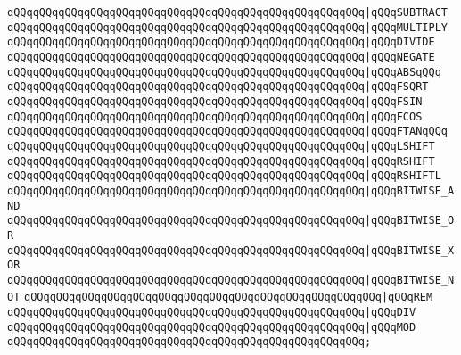 \verb|qQQqqQQqqQQqqQQqqQQqqQQqqQQqqQQqqQQqqQQqqQQqqQQqqQQqqQQq|\verb#|qQQqSUBTRACT#\newline
\verb|qQQqqQQqqQQqqQQqqQQqqQQqqQQqqQQqqQQqqQQqqQQqqQQqqQQqqQQq|\verb#|qQQqMULTIPLY#\newline
\verb|qQQqqQQqqQQqqQQqqQQqqQQqqQQqqQQqqQQqqQQqqQQqqQQqqQQqqQQq|\verb#|qQQqDIVIDE#\newline
\verb|qQQqqQQqqQQqqQQqqQQqqQQqqQQqqQQqqQQqqQQqqQQqqQQqqQQqqQQq|\verb#|qQQqNEGATE#\newline
\verb|qQQqqQQqqQQqqQQqqQQqqQQqqQQqqQQqqQQqqQQqqQQqqQQqqQQqqQQq|\verb#|qQQqABSqQQq#\newline
\verb|qQQqqQQqqQQqqQQqqQQqqQQqqQQqqQQqqQQqqQQqqQQqqQQqqQQqqQQq|\verb#|qQQqFSQRT#\newline
\verb|qQQqqQQqqQQqqQQqqQQqqQQqqQQqqQQqqQQqqQQqqQQqqQQqqQQqqQQq|\verb#|qQQqFSIN#\newline
\verb|qQQqqQQqqQQqqQQqqQQqqQQqqQQqqQQqqQQqqQQqqQQqqQQqqQQqqQQq|\verb#|qQQqFCOS#\newline
\verb|qQQqqQQqqQQqqQQqqQQqqQQqqQQqqQQqqQQqqQQqqQQqqQQqqQQqqQQq|\verb#|qQQqFTANqQQq#\newline
\verb|qQQqqQQqqQQqqQQqqQQqqQQqqQQqqQQqqQQqqQQqqQQqqQQqqQQqqQQq|\verb#|qQQqLSHIFT#\newline
\verb|qQQqqQQqqQQqqQQqqQQqqQQqqQQqqQQqqQQqqQQqqQQqqQQqqQQqqQQq|\verb#|qQQqRSHIFT#\newline
\verb|qQQqqQQqqQQqqQQqqQQqqQQqqQQqqQQqqQQqqQQqqQQqqQQqqQQqqQQq|\verb#|qQQqRSHIFTL#\newline
\verb|qQQqqQQqqQQqqQQqqQQqqQQqqQQqqQQqqQQqqQQqqQQqqQQqqQQqqQQq|\verb#|qQQqBITWISE_AND#\newline
\verb|qQQqqQQqqQQqqQQqqQQqqQQqqQQqqQQqqQQqqQQqqQQqqQQqqQQqqQQq|\verb#|qQQqBITWISE_OR#\newline
\verb|qQQqqQQqqQQqqQQqqQQqqQQqqQQqqQQqqQQqqQQqqQQqqQQqqQQqqQQq|\verb#|qQQqBITWISE_XOR#\newline
\verb|qQQqqQQqqQQqqQQqqQQqqQQqqQQqqQQqqQQqqQQqqQQqqQQqqQQqqQQq|\verb#|qQQqBITWISE_NOT#\newline
\verb|qQQqqQQqqQQqqQQqqQQqqQQqqQQqqQQqqQQqqQQqqQQqqQQqqQQqqQQq|\verb#|qQQqREM#\newline
\verb|qQQqqQQqqQQqqQQqqQQqqQQqqQQqqQQqqQQqqQQqqQQqqQQqqQQqqQQq|\verb#|qQQqDIV#\newline
\verb|qQQqqQQqqQQqqQQqqQQqqQQqqQQqqQQqqQQqqQQqqQQqqQQqqQQqqQQq|\verb#|qQQqMOD#\newline
\verb|qQQqqQQqqQQqqQQqqQQqqQQqqQQqqQQqqQQqqQQqqQQqqQQqqQQqqQQq;|\newline
\newline
